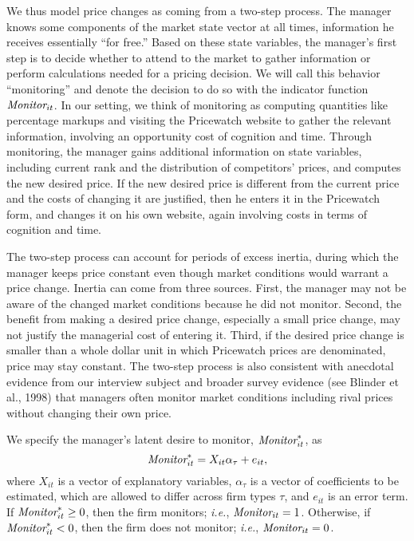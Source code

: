 \documentclass[11pt]{article}
\newcommand{\Monitor}{\mbox{\it Monitor}}
\begin{document}
\begin{spacing}{1.3}
We thus model price changes as coming from a two-step process. The
manager knows some components of the market state vector at all times,
information he receives essentially ``for free.''  Based on these
state variables, the manager's first step is to decide whether to
attend to the market to gather information or perform calculations
needed for a pricing decision. We will call this behavior
``monitoring'' and denote the decision to do so with the indicator
function $\Monitor_{it}$.  In our setting, we think of monitoring as
computing quantities like percentage markups and visiting the
Pricewatch website to gather the relevant information, involving an
opportunity cost of cognition and time. Through monitoring, the
manager gains additional information on state variables, including
current rank and the distribution of competitors' prices, and computes
the new desired price. If the new desired price is different from the
current price and the costs of changing it are justified, then he
enters it in the Pricewatch form, and changes it on his own website,
again involving costs in terms of cognition and time.

The two-step process can account for periods of excess inertia, during
which the manager keeps price constant even though market conditions
would warrant a price change. Inertia can come from three
sources. First, the manager may not be aware of the changed market
conditions because he did not monitor. Second, the benefit from making
a desired price change, especially a small price change, may not
justify the managerial cost of entering it. Third, if the desired
price change is smaller than a whole dollar unit in which Pricewatch
prices are denominated, price may stay constant. The two-step process
is also consistent with anecdotal evidence from our interview subject
and broader survey evidence (see Blinder et al., 1998) that managers
often monitor market conditions including rival prices without
changing their own price.

We specify the manager's latent desire to monitor, $\Monitor^*_{it}$,
as
\begin{equation}
\label{monitoring}
\Monitor_{it}^* = X_{it} \alpha_{\tau} + e_{it},
\end{equation}
where $X_{it}$ is a vector of explanatory variables, $\alpha_{\tau}$
is a vector of coefficients to be estimated, which are allowed to
differ across firm types $\tau$, and $e_{it}$ is an error term. If
$\Monitor^*_{it} \geq 0$, then the firm monitors; {\it i.e.},
$\Monitor_{it} = 1$. Otherwise, if $\Monitor^*_{it} < 0$, then the
firm does not monitor; {\it i.e.}, $\Monitor_{it} = 0$.


\end{spacing}
\end{document}
